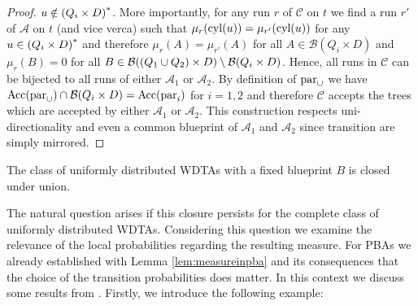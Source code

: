 \begin{proof}
  $u\notin\left(Q_{i}\times D\right)^{*}$. More importantly, for any run $r$ of
  $\mathcal{C}$ on $t$ we find a run $r'$ of $\mathcal{A}$ on $t$ (and vice
  verca) such that $\mu_{r}(\operatorname{cyl}(u)) = \mu_{r'}(\operatorname{cyl}(u))$ for any 
  $u\in\left(Q_{i}\times D\right)^{*}$ and therefore $\mu_{r}(A) = \mu_{r'}(A)$ for
  all $A\in\mathcal{B}(Q_{i}\times D)$ and $\mu_{r}(B) = 0$ for all 
  $B\in\mathcal{B}(\left(Q_{1}\cup Q_{2}\right)\times D)
    \setminus\mathcal{B}(Q_{i}\times D)$. Hence, all runs in $\mathcal{C}$
  can be bijected to all runs of either $\mathcal{A}_{1}$ or $\mathcal{A}_{2}$.
  By definition of $\operatorname{par}_{\cup}$ we have 
  $\operatorname{Acc}(\operatorname{par}_{\cup})\cap\mathcal{B}(Q_{i}\times D) = \operatorname{Acc}(\operatorname{par}_{i})$ for
  $i = 1,2$ and therefore $\mathcal{C}$ accepts the trees which are accepted by 
  either $\mathcal{A}_{1}$ or $\mathcal{A}_{2}$. This construction respects 
  uni-directionality and even a common blueprint of $\mathcal{A}_{1}$ and 
  $\mathcal{A}_{2}$ since transition are simply mirrored.
\end{proof}
\begin{corollary}
  The class of uniformly distributed \acp{WDTA} with a fixed blueprint $B$ is 
  closed under union.
\end{corollary}
The natural question arises if this closure persists for the complete class of 
uniformly distributed \acp{WDTA}. Considering this question we examine the
relevance of the local probabilities regarding the resulting measure. For 
\acp{PBA} we already established with Lemma \ref{lem:measureinpba} and its 
consequences that the choice of the transition probabilities does matter. In 
this context we discuss some results from \cite{RandAutoInfTrees}. Firstly, we 
introduce the following example:

